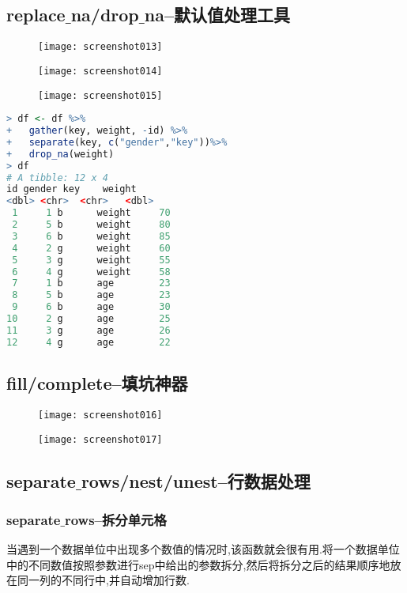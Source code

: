 \documentclass[11pt,a4paper,oneside]{book}
\begin{document}
\subsection{replace$ \_ $na/drop$ \_ $na--默认值处理工具}
\begin{figure}[H]
	\centering
	\texttt{[image: screenshot013]}
\end{figure}
\begin{figure}[H]
	\centering
	\texttt{[image: screenshot014]}
\end{figure}
\begin{figure}[H]
	\centering
	\texttt{[image: screenshot015]}
\end{figure}

\begin{lstlisting}[language=r]
> df <- df %>%
+   gather(key, weight, -id) %>%
+   separate(key, c("gender","key"))%>%
+   drop_na(weight)	
> df
# A tibble: 12 x 4
id gender key    weight
<dbl> <chr>  <chr>   <dbl>
 1     1 b      weight     70
 2     5 b      weight     80
 3     6 b      weight     85
 4     2 g      weight     60
 5     3 g      weight     55
 6     4 g      weight     58
 7     1 b      age        23
 8     5 b      age        23
 9     6 b      age        30
10     2 g      age        25
11     3 g      age        26
12     4 g      age        22
\end{lstlisting}

\subsection{fill/complete--填坑神器}
\begin{figure}[H]
	\centering
	\texttt{[image: screenshot016]}
\end{figure}
\begin{figure}[H]
	\centering
	\texttt{[image: screenshot017]}
\end{figure}
\subsection{separate$ \_ $rows/nest/unest--行数据处理}
\subsubsection{separate$ \_ $rows--拆分单元格}
当遇到一个数据单位中出现多个数值的情况时,该函数就会很有用.将一个数据单位中的不同数值按照参数进行sep中给出的参数拆分,然后将拆分之后的结果顺序地放在同一列的不同行中,并自动增加行数.
\end{document}
